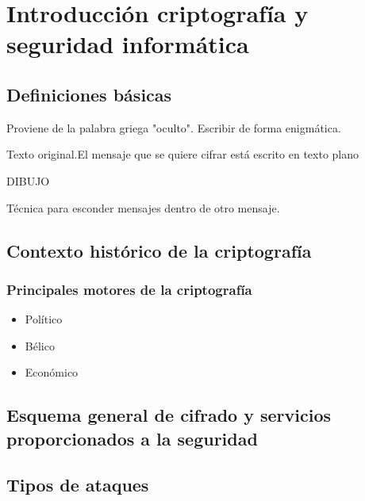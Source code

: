 \chapter{Introducción criptografía y seguridad informática}
\section{ Definiciones básicas}

 \begin{defn}[Criptografía] Proviene de la palabra griega "oculto". Escribir de forma enigmática.
 \end{defn}
 
 
 \begin{defn}
 	Texto original.El mensaje que se quiere cifrar está escrito en texto plano
 \end{defn}
 
 
 \begin{defn}
	DIBUJO
 \end{defn}
 
 \begin{defn}[Estenografía]
 	Técnica para esconder mensajes dentro de otro mensaje.
 \end{defn}
 
 
 \section{Contexto histórico de la criptografía}
 
 \subsection{Principales motores de la criptografía}
 
 \begin{itemize}
 	\item Político\item Bélico \item Económico
 \end{itemize}
 
\section{Esquema general de cifrado y servicios proporcionados a la seguridad}

\section{Tipos de ataques}
